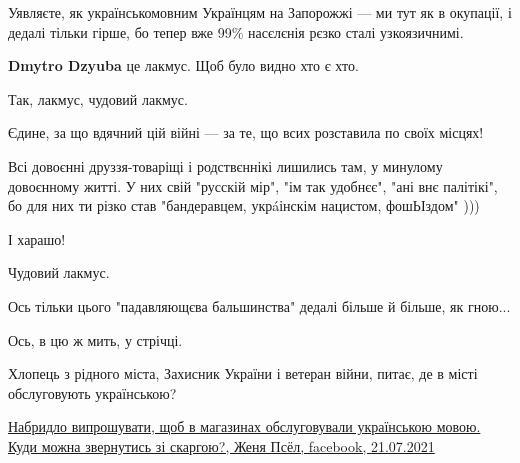 \begin{itemize}
\begin{itemize}
\end{itemize}

 

Уявляєте, як українськомовним Українцям на Запорожжі — ми тут як в окупації, і
дедалі тільки гірше, бо тепер вже 99\% насєлєнія рєзко сталі узкоязичнимі.

\begin{itemize}
 
\textbf{Dmytro Dzyuba} це лакмус. Щоб було видно хто є хто.

 

Так, лакмус, чудовий лакмус.

Єдине, за що вдячний цій війні — за те, що всих розставила по своїх місцях!

Всі довоєнні друззя-товаріщі і родствєннікі лишились там, у минулому довоєнному
житті. У них свій "русскій мір", "ім так удобнєє", "ані внє палітікі", бо для
них ти різко став "бандеравцем, укрáінскім нацистом, фошЬІздом" )))

І харашо!

Чудовий лакмус.

Ось тільки цього "падавляющєва бальшинства" дедалі більше й більше, як гною...

 

Ось, в цю ж мить, у стрічці.

Хлопець з рідного міста, Захисник України і ветеран війни, питає, де в місті обслуговують українською?

\href{https://www.facebook.com/permalink.php?story_fbid=2588326674810356&id=100008991462234}{%
Набридло випрошувати, щоб в магазинах обслуговували українською мовою. Куди можна звернутись зі скаргою?,%
Женя Псёл, facebook, 21.07.2021%
}


\end{itemize}
\end{itemize}
